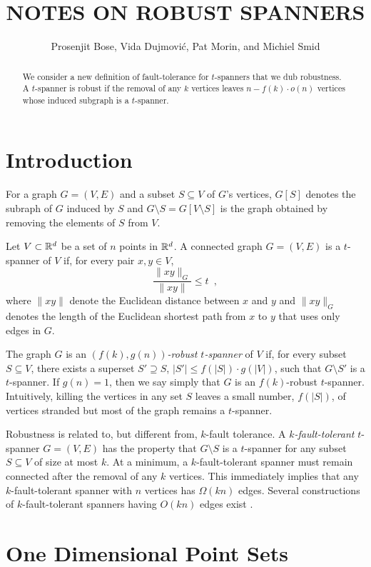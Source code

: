 \documentclass{patmorin}
\title{\MakeUppercase{Notes on Robust Spanners}}
\author{Prosenjit Bose, Vida Dujmovi\'c, Pat Morin, and Michiel Smid}
\begin{document}
\maketitle

\begin{abstract}
We consider a new definition of fault-tolerance for $t$-spanners that
we dub robustness.  A $t$-spanner is robust if the removal of any $k$
vertices leaves $n-f(k)\cdot o(n)$ vertices whose induced subgraph is
a $t$-spanner.
\end{abstract}

\section{Introduction}

For a graph $G=(V,E)$ and a subset $S\subseteq V$ of $G$'s vertices,
$G[S]$ denotes the subraph of $G$ induced by $S$ and $G\setminus
S=G[V\setminus S]$ is the graph obtained by removing the elements of $S$
from $V$.

Let $V\subset \mathbb{R}^d$ be a set of $n$ points in $\mathbb{R}^d$.  A connected graph
$G=(V,E)$ is a $t$-spanner of $V$ if, for every pair $x,y\in V$,
\[
   \frac{\|xy\|_G}{\|xy\|} \le t \enspace ,
\]
where $\|xy\|$ denote the Euclidean distance between $x$ and $y$ and
$\|xy\|_G$ denotes the length of the Euclidean shortest path from $x$ to
$y$ that uses only edges in $G$.

The graph $G$ is an \emph{$(f(k),g(n))$-robust $t$-spanner} of $V$ if,
for every subset $S\subseteq V$, there exists a superset $S'\supseteq S$,
$|S'|\le f(|S|)\cdot g(|V|)$, such that $G\setminus S'$ is a $t$-spanner.
If $g(n)=1$, then we say simply that $G$ is an $f(k)$-robust $t$-spanner.
Intuitively, killing the vertices in any set $S$ leaves a small
number, $f(|S|)$, of vertices stranded but most of the graph remains
a $t$-spanner.

Robustness is related to, but different from, $k$-fault tolerance.
A \emph{$k$-fault-tolerant} $t$-spanner $G=(V,E)$ has the property that
$G\setminus S$ is a $t$-spanner for any subset $S\subseteq V$ of size
at most $k$.  At a minimum, a $k$-fault-tolerant spanner must remain
connected after the removal of any $k$ vertices.  This immediately implies
that any $k$-fault-tolerant spanner with $n$ vertices has $\Omega(kn)$
edges.  Several constructions of $k$-fault-tolerant spanners having
$O(kn)$ edges exist \cite{cz04,lns02,l99}.
 

\section{One Dimensional Point Sets}
\end{document}
